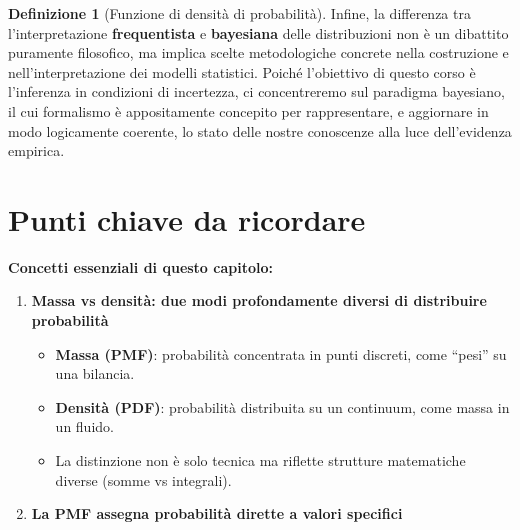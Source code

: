 \documentclass[
  italian,
  letterpaper,
  a4paper,
  11pt,
  open=any]{scrbook}
\providecommand{\tightlist}{%
  \setlength{\itemsep}{0pt}\setlength{\parskip}{0pt}}
\theoremstyle{plain}
\theoremstyle{definition}
\theoremstyle{definition}
\newtheorem{definition}{Definizione}[chapter]
\theoremstyle{remark}
\begin{document}
\begin{definition}[Funzione di densità di
probabilità]
Infine, la differenza tra l'interpretazione \textbf{frequentista} e
\textbf{bayesiana} delle distribuzioni non è un dibattito puramente
filosofico, ma implica scelte metodologiche concrete nella costruzione e
nell'interpretazione dei modelli statistici. Poiché l'obiettivo di
questo corso è l'inferenza in condizioni di incertezza, ci concentreremo
sul paradigma bayesiano, il cui formalismo è appositamente concepito per
rappresentare, e aggiornare in modo logicamente coerente, lo stato delle
nostre conoscenze alla luce dell'evidenza empirica.

\section*{Punti chiave da ricordare}\label{punti-chiave-da-ricordare-6}


\begin{tcolorbox}[enhanced jigsaw, arc=.35mm, bottomrule=.15mm, bottomtitle=1mm, breakable, colback=white, colbacktitle=quarto-callout-important-color!10!white, colframe=quarto-callout-important-color-frame, coltitle=black, left=2mm, leftrule=.75mm, opacityback=0, opacitybacktitle=0.6, rightrule=.15mm, title=\textcolor{quarto-callout-important-color}{\faExclamation}\hspace{0.5em}{Importante}, titlerule=0mm, toprule=.15mm, toptitle=1mm]

\textbf{Concetti essenziali di questo capitolo:}

\begin{enumerate}
\def\labelenumi{\arabic{enumi}.}
\tightlist
\item
  \textbf{Massa vs densità: due modi profondamente diversi di
  distribuire probabilità}

  \begin{itemize}
  \tightlist
  \item
    \textbf{Massa (PMF)}: probabilità concentrata in punti discreti,
    come ``pesi'' su una bilancia.
  \item
    \textbf{Densità (PDF)}: probabilità distribuita su un continuum,
    come massa in un fluido.
  \item
    La distinzione non è solo tecnica ma riflette strutture matematiche
    diverse (somme vs integrali).
  \end{itemize}
\item
  \textbf{La PMF assegna probabilità dirette a valori specifici}


\end{enumerate}
\end{tcolorbox}
\end{definition}
\end{document}
